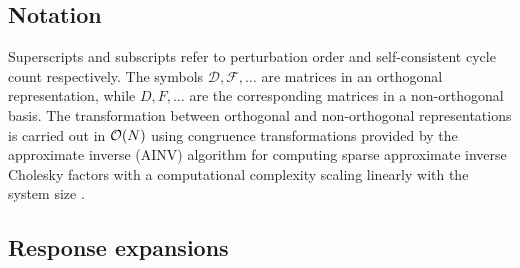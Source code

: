 \documentclass[prl,aps,preprint,showpacs,superbib]{revtex4}
\begin{document}
\subsection{Notation}

Superscripts and subscripts refer to perturbation order and 
self-consistent cycle count respectively. The symbols $\mathcal{D},\mathcal{F},\dots$
are matrices in an orthogonal representation, while
$D,F,\dots$ are the corresponding matrices in a non-orthogonal basis.
The transformation between orthogonal and non-orthogonal 
representations is carried out in ${\cal O}(N)$ using
congruence transformations \cite{JWilkinson65,GStewart73} provided 
by the approximate inverse (AINV) algorithm for computing  sparse 
approximate inverse Cholesky factors with a computational complexity
scaling linearly with the system size \cite{MBenzi95,MBenzi96,MBenzi01}.

\subsection{Response expansions}
\end{document}
